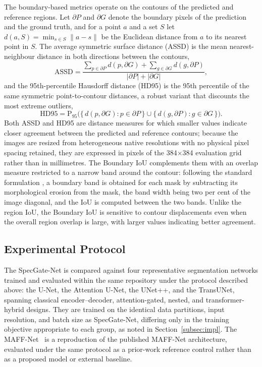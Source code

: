 The boundary-based metrics operate on the contours of the predicted and reference regions. Let $\partial P$ and $\partial G$ denote the boundary pixels of the prediction and the ground truth, and for a point $a$ and a set $S$ let $d(a,S)=\min_{s\in S}\lVert a-s\rVert$ be the Euclidean distance from $a$ to its nearest point in $S$. The average symmetric surface distance (ASSD) is the mean nearest-neighbour distance in both directions between the contours,
\begin{equation}
\mathrm{ASSD} = \frac{\sum_{p\in\partial P} d(p,\partial G) + \sum_{g\in\partial G} d(g,\partial P)}{\lvert\partial P\rvert + \lvert\partial G\rvert}, \tag{8}
\label{eq:12}
\end{equation}
and the 95th-percentile Hausdorff distance (HD95) is the 95th percentile of the same symmetric point-to-contour distances, a robust variant that discounts the most extreme outliers,
\begin{equation}
\mathrm{HD95} = \mathrm{P}_{95}\big(\{\, d(p,\partial G) : p\in\partial P\,\} \cup \{\, d(g,\partial P) : g\in\partial G\,\}\big). \tag{9}
\label{eq:13}
\end{equation}
Both ASSD and HD95 are distance measures for which smaller values indicate closer agreement between the predicted and reference contours; because the images are resized from heterogeneous native resolutions with no physical pixel spacing retained, they are expressed in pixels of the 384$\times$384 evaluation grid rather than in millimetres. The Boundary IoU complements them with an overlap measure restricted to a narrow band around the contour: following the standard formulation \cite{ref12}, a boundary band is obtained for each mask by subtracting its morphological erosion from the mask, the band width being two per cent of the image diagonal, and the IoU is computed between the two bands. Unlike the region IoU, the Boundary IoU is sensitive to contour displacements even when the overall region overlap is large, with larger values indicating better agreement.

\subsection{Experimental Protocol}
\label{subsec:protocol}

The SpecGate-Net is compared against four representative segmentation networks trained and evaluated within the same repository under the protocol described above: the U-Net, the Attention U-Net, the UNet++, and the TransUNet, spanning classical encoder--decoder, attention-gated, nested, and transformer-hybrid designs. They are trained on the identical data partitions, input resolution, and batch size as SpecGate-Net, differing only in the training objective appropriate to each group, as noted in Section~\ref{subsec:impl}. The MAFF-Net~\cite{ref15} is a reproduction of the published MAFF-Net architecture, evaluated under the same protocol as a prior-work reference control rather than as a proposed model or external baseline.

